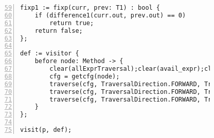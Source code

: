 \begin{figure}[ht!]
\begin{lstlisting}[numbers=left, tabsize=4, escapechar=@, caption={Available expression analysis},label={lst:ae-code},firstline=59, firstnumber=59]
fixp1 := fixp(curr, prev: T1) : bool {
	if (difference1(curr.out, prev.out) == 0)
		return true;	
	return false;
};

def := visitor {
	before node: Method -> {
		clear(allExprTraversal);clear(avail_expr);clear(killTraversal);clear(allExprset);
		cfg = getcfg(node);
		traverse(cfg, TraversalDirection.FORWARD, TraversalKind.HYBRID, allExprTraversal);
		traverse(cfg, TraversalDirection.FORWARD, TraversalKind.HYBRID, killTraversal);
		traverse(cfg, TraversalDirection.FORWARD, TraversalKind.HYBRID, avail_expr, fixp1);		
	}
};

visit(p, def);
\end{lstlisting}
\end{figure}